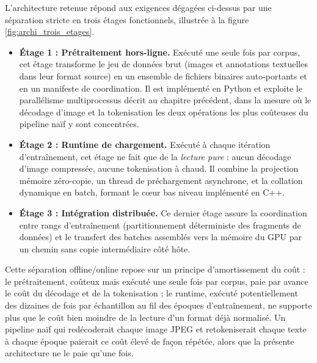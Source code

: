 \documentclass[12pt,a4paper]{report}
\begin{document}
L'architecture retenue répond aux exigences dégagées ci-dessus par une séparation stricte en trois étages fonctionnels, illustrée à la figure \ref{fig:archi_trois_etages}.

\begin{itemize}
  \item \textbf{Étage 1 : Prétraitement hors-ligne.} Exécuté une seule fois par corpus, cet étage transforme le jeu de données brut (images et annotations textuelles dans leur format source) en un ensemble de fichiers binaires auto-portants et en un manifeste de coordination. Il est implémenté en Python et exploite le parallélisme multiprocessus décrit au chapitre précédent, dans la mesure où le décodage d'image et la tokenisation les deux opérations les plus coûteuses du pipeline naïf y sont concentrées.
  \item \textbf{Étage 2 : Runtime de chargement.} Exécuté à chaque itération d'entraînement, cet étage ne fait que de la \emph{lecture pure} : aucun décodage d'image compressée, aucune tokenisation à chaud. Il combine la projection mémoire zéro-copie, un thread de préchargement asynchrone, et la collation dynamique en batch, formant le cœur bas niveau implémenté en C++.
  \item \textbf{Étage 3 : Intégration distribuée.} Ce dernier étage assure la coordination entre rangs d'entraînement (partitionnement déterministe des fragments de données) et le transfert des batches assemblés vers la mémoire du GPU par un chemin sans copie intermédiaire côté hôte.
\end{itemize}

Cette séparation offline/online repose sur un principe d'amortissement du coût : le prétraitement, coûteux mais exécuté une seule fois par corpus, paie par avance le coût du décodage et de la tokenisation ; le runtime, exécuté potentiellement des dizaines de fois par échantillon au fil des époques d'entraînement, ne supporte plus que le coût bien moindre de la lecture d'un format déjà normalisé. Un pipeline naïf qui redécoderait chaque image JPEG et retokeniserait chaque texte à chaque époque paierait ce coût élevé de façon répétée, alors que la présente architecture ne le paie qu'une fois.
\end{document}
